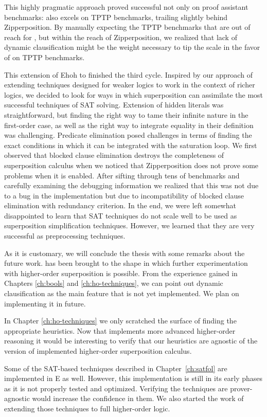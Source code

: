 This highly pragmatic approach proved successful not only on proof assistant
benchmarks: \ehohii{} also excels on TPTP benchmarks, trailing slightly behind
Zipperposition. By manually expecting the TPTP benchmarks that are out of reach
for \ehohii{}, but within the reach of Zipperposition, we realized that lack of
dynamic clausification might be the weight necessary to tip the scale in the
favor of \ehohii{} on TPTP benchmarks.

This extension of Ehoh to \ehohii{} finished the third cycle. Inspired by our
approach of extending techniques designed for weaker logics to work in the
context of richer logics, we decided to look for ways in which superposition can
assimilate the most successful techniques of SAT solving. Extension of hidden
literals was straightforward, but finding the right way to tame their infinite
nature in the first-order case, as well as the right way to integrate equality
in their definition was challenging. Predicate elimination posed challenges in
terms of finding the exact conditions in which it can be integrated with the
saturation loop. We first observed that blocked clause elimination destroys the
completeness of superposition calculus when we noticed that Zipperposition does
not prove some problems when it is enabled. After sifting through tens of
benchmarks and carefully examining the debugging information we realized that
this was not due to a bug in the implementation but due to incompatibility of
blocked clause elimination with redundancy criterion. In the end, we were left
somewhat disappointed to learn that SAT techniques do not scale well to be used
as superposition simplification techniques. However, we learned that they are
very successful as preprocessing techniques.

As it is customary, we will conclude the thesis with some remarks about the future work. \ehohii{} has been brought to the shape
in which further experimentation with higher-order superposition is possible.
From the experience gained in Chapters \ref{ch:bools} and
\ref{ch:ho-techniques}, we can point out dynamic clausification as the main
feature that is not yet implemented. We plan on implementing it in future.

In Chapter \ref{ch:ho-techniques} we only scratched the surface of finding the
appropriate heuristics. Now that \ehohii{} implements more advanced higher-order
reasoning it would be interesting to verify that our heuristics are agnostic of
the version of implemented higher-order superposition calculus. 

Some of the SAT-based techniques described in Chapter~\ref{ch:satfol} are
implemented in E as well. However, this implementation is still in its early
phases as it is not properly tested and optimized. Verifying the techniques are
prover-agnostic would increase the confidence in them. We also started the work of extending
those techniques to full higher-order logic.
